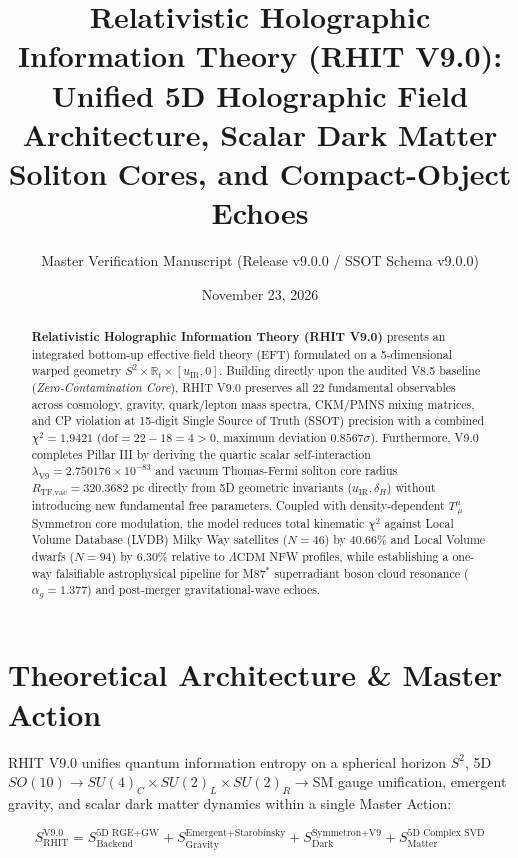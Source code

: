 \documentclass[11pt, a4paper]{article}
\title{\textbf{\color{primary}Relativistic Holographic Information Theory (RHIT V9.0):\\Unified 5D Holographic Field Architecture, Scalar Dark Matter Soliton Cores, and Compact-Object Echoes}}
\author{Master Verification Manuscript (Release v9.0.0 / SSOT Schema v9.0.0)}
\date{November 23, 2026}
\begin{document}
\maketitle

\begin{abstract}
\noindent\textbf{Relativistic Holographic Information Theory (RHIT V9.0)} presents an integrated bottom-up effective field theory (EFT) formulated on a 5-dimensional warped geometry $S^2 \times \mathbb{R}_t \times [u_{\text{IR}}, 0]$. Building directly upon the audited V8.5 baseline (\emph{Zero-Contamination Core}), RHIT V9.0 preserves all 22 fundamental observables across cosmology, gravity, quark/lepton mass spectra, CKM/PMNS mixing matrices, and CP violation at 15-digit Single Source of Truth (SSOT) precision with a combined $\chi^2 = 1.9421$ ($\text{dof} = 22 - 18 = 4 > 0$, maximum deviation $0.8567\sigma$). Furthermore, V9.0 completes Pillar III by deriving the quartic scalar self-interaction $\lambda_{\text{V9}} = 2.750176 \times 10^{-83}$ and vacuum Thomas-Fermi soliton core radius $R_{\text{TF,vac}} = 320.3682\text{ pc}$ directly from 5D geometric invariants ($u_{\text{IR}}, \delta_H$) without introducing new fundamental free parameters. Coupled with density-dependent $T^\mu_{\ \mu}$ Symmetron core modulation, the model reduces total kinematic $\chi^2$ against Local Volume Database (LVDB) Milky Way satellites ($N = 46$) by $40.66\%$ and Local Volume dwarfs ($N = 94$) by $6.30\%$ relative to $\Lambda\text{CDM}$ NFW profiles, while establishing a one-way falsifiable astrophysical pipeline for M87$^*$ superradiant boson cloud resonance ($\alpha_g = 1.377$) and post-merger gravitational-wave echoes.
\end{abstract}

\section{Theoretical Architecture \& Master Action}

RHIT V9.0 unifies quantum information entropy on a spherical horizon $S^2$, 5D $SO(10) \to SU(4)_C \times SU(2)_L \times SU(2)_R \to \text{SM}$ gauge unification, emergent gravity, and scalar dark matter dynamics within a single Master Action:

\begin{equation}
S_{\text{RHIT}}^{\text{V9.0}} = S_{\text{Backend}}^{\text{5D RGE+GW}} + S_{\text{Gravity}}^{\text{Emergent+Starobinsky}} + S_{\text{Dark}}^{\text{Symmetron+V9}} + S_{\text{Matter}}^{\text{5D Complex SVD}}
\end{equation}
\end{document}
